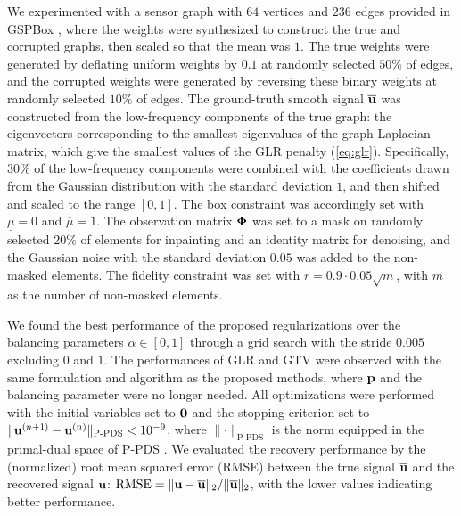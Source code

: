 We experimented with a sensor graph with $64$ vertices and $236$ edges provided in GSPBox \cite{perraudin2014gspbox}, where the weights were synthesized to construct the true and corrupted graphs, then scaled so that the mean was $1$.
The true weights were generated by deflating uniform weights by $0.1$ at randomly selected $50\%$ of edges, and the corrupted weights were generated by reversing these binary weights at randomly selected $10\%$ of edges.
The ground-truth smooth signal $\overline{\mathbf{u}}$ was constructed from the low-frequency components of the true graph: the eigenvectors corresponding to the smallest eigenvalues of the graph Laplacian matrix, which give the smallest values of the GLR penalty (\ref{eq:glr}).
Specifically, $30\%$ of the low-frequency components were combined with the coefficients drawn from the Gaussian distribution with the standard deviation $1$, and then shifted and scaled to the range $[0, 1]$.
The box constraint was accordingly set with $\underline{\mu} = 0$ and $\overline{\mu} = 1$. 
The observation matrix $\mathbf{\Phi}$ was set to a mask on randomly selected $20\%$ of elements for inpainting and an identity matrix for denoising, and the Gaussian noise with the standard deviation $0.05$ was added to the non-masked elements.
The fidelity constraint was set with $r = 0.9 \cdot 0.05 \sqrt{m}$, with $m$ as the number of non-masked elements.

We found the best performance of the proposed regularizations over the balancing parameters $\alpha \in [0, 1]$ through a grid search with the stride $0.005$ excluding $0$ and $1$.
The performances of GLR and GTV were observed with the same formulation and algorithm as the proposed methods, where $\mathbf{p}$ and the balancing parameter were no longer needed.
All optimizations were performed with the initial variables set to $\mathbf{0}$ and the stopping criterion set to $\lVert \mathbf{u}^{(n+1)} - \mathbf{u}^{(n)} \rVert_\text{P-PDS} < 10^{-9}$, where $\lVert \cdot \rVert_\text{P-PDS}$ is the norm equipped in the primal-dual space of P-PDS \cite{chambolle2011first}.
We evaluated the recovery performance by the (normalized) root mean squared error (RMSE) between the true signal $\overline{\mathbf{u}}$ and the recovered signal $\mathbf{u}$: $\text{RMSE} = \lVert \mathbf{u} - \overline{\mathbf{u}} \rVert_2 / \lVert \overline{\mathbf{u}} \rVert_2$, with the lower values indicating better performance.